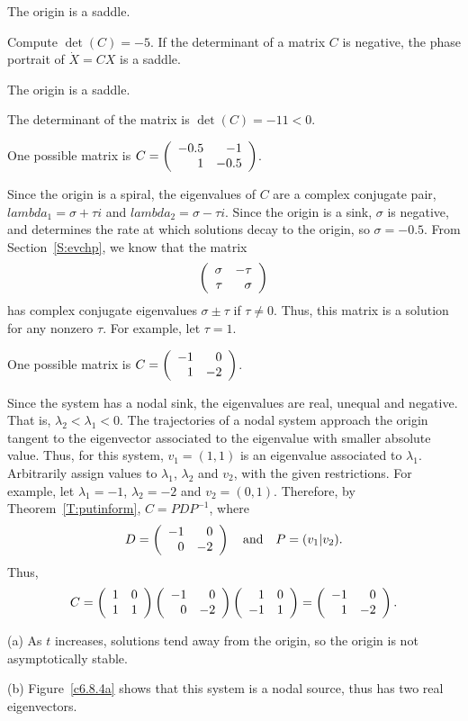  \ans The origin is a saddle.

\soln Compute $\det(C) = -5$.  If the determinant of a matrix $C$ is
negative, the phase portrait of $\dot{X} = CX$ is a saddle.

 \ans The origin is a saddle.

\soln The determinant of the matrix is $\det(C) = -11 < 0$.

\ans One possible matrix is $C = \left(\begin{array}{rr} -0.5 & -1\\ 1 &-0.5\end{array}\right)$.

\soln Since the origin is a spiral, the eigenvalues of $C$ are a complex
conjugate pair, $lambda_1 = \sigma + \tau i$ and $lambda_2 = \sigma -
\tau i$.  Since the origin is a sink, $\sigma$ is negative, and determines
the rate at which solutions decay to the origin, so $\sigma = -0.5$.
From Section~\ref{S:evchp}, we know that the matrix
\[ \left(\begin{array}{rr} \sigma & -\tau\\ \tau &\sigma\end{array}\right) \]
has complex conjugate eigenvalues $\sigma \pm \tau$ if $\tau \neq 0$.
Thus, this matrix is a solution for any nonzero $\tau$.  For example,
let $\tau = 1$.

\ans One possible matrix is $C = \left(\begin{array}{rr} -1 & 0\\ 1 &-2\end{array}\right)$.

\soln Since the system has a nodal sink, the eigenvalues are real, unequal
and negative.  That is, $\lambda_2 < \lambda_1 < 0$.  The trajectories
of a nodal system approach the origin tangent to the eigenvector
associated to the eigenvalue with smaller absolute value.  Thus, for
this system, $v_1 = (1,1)$ is an eigenvalue associated to $\lambda_1$.
Arbitrarily assign values to $\lambda_1$, $\lambda_2$ and $v_2$, with
the given restrictions.  For example, let $\lambda_1 = -1$, $\lambda_2
= -2$ and $v_2 = (0,1)$.  Therefore, by
Theorem~\ref{T:putinform}, $C = PDP^{-1}$, where
\[ D = \left(\begin{array}{rr} -1 & 0\\ 0 &-2\end{array}\right) \quad\mbox{and}\quad P = (v_1|v_2). \]
Thus,
\[ C = \left(\begin{array}{rr} 1 & 0\\ 1 &1\end{array}\right)\left(\begin{array}{rr} -1 & 0\\ 0 &-2\end{array}\right)\left(\begin{array}{rr} 1 & 0\\ -1 &1\end{array}\right) =
\left(\begin{array}{rr} -1 & 0\\ 1 &-2\end{array}\right). \]

(a) As $t$ increases, solutions tend away from the origin, so the origin
is not asymptotically stable.

(b) Figure~\ref{c6.8.4a} shows that this system is a nodal source,
thus has two real eigenvectors.

\begin{figure}[htb]
                       \centerline{%
                       }
\end{figure}



